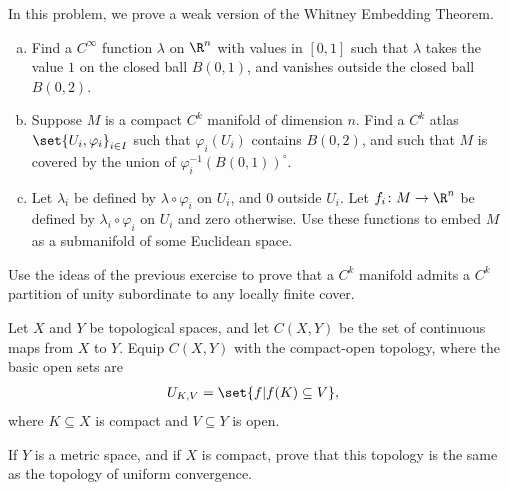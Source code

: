\documentclass[10pt]{mypackage}
\begin{document}
\begin{problem}[Problem 5]
  In this problem, we prove a weak version of the Whitney Embedding Theorem.
  \begin{enumerate}[(a)]
    \item Find a $C^{\infty}$ function $\lambda$ on $\R^{n}$ with values in $[0,1]$ such that $\lambda$ takes the value $1$ on the closed ball $B\left( 0,1 \right)$, and vanishes outside the closed ball $B\left( 0,2 \right)$.
    \item Suppose $M$ is a compact $C^{k}$ manifold of dimension $n$. Find a $C^{k}$ atlas $\set{U_i,\varphi_i}_{i\in I}$ such that $\varphi_i\left( U_i \right)$ contains $B\left( 0,2 \right)$, and such that $M$ is covered by the union of $\varphi_i^{-1}\left( B\left( 0,1 \right) \right)^{\circ}$.
    \item Let $\lambda_i$ be defined by $\lambda\circ\varphi_i$ on $U_i$, and $0$ outside $U_i$. Let $f_i\colon M\rightarrow \R^n$ be defined by $\lambda_i\circ\varphi_i$ on $U_i$ and zero otherwise. Use these functions to embed $M$ as a submanifold of some Euclidean space.
  \end{enumerate}
\end{problem}
\begin{problem}[Problem 6]
  Use the ideas of the previous exercise to prove that a $C^{k}$ manifold admits a $C^{k}$ partition of unity subordinate to any locally finite cover.
\end{problem}
\begin{problem}[Problem 7]
  Let $X$ and $Y$ be topological spaces, and let $C\left( X,Y \right)$ be the set of continuous maps from $X$ to $Y$. Equip $C\left( X,Y \right)$ with the compact-open topology, where the basic open sets are
  \begin{align*}
    U_{K,V} &= \set{f | f(K)\subseteq V},
  \end{align*}
  where $K\subseteq X$ is compact and $V\subseteq Y$ is open.\newline

  If $Y$ is a metric space, and if $X$ is compact, prove that this topology is the same as the topology of uniform convergence.
\end{problem}
\end{document}
